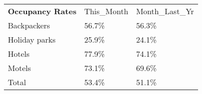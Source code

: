 \begin{tabular}[t]{p{5cm}p{1.3cm}p{1.2cm}}
 \textbf{Occupancy Rates} & This\_Month & Month\_Last\_Yr \\ 
 Backpackers & 56.7\% & 56.3\% \\ 
  Holiday parks & 25.9\% & 24.1\% \\ 
  Hotels & 77.9\% & 74.1\% \\ 
  Motels & 73.1\% & 69.6\% \\ 
  Total & 53.4\% & 51.1\% \\ 
  \end{tabular}
